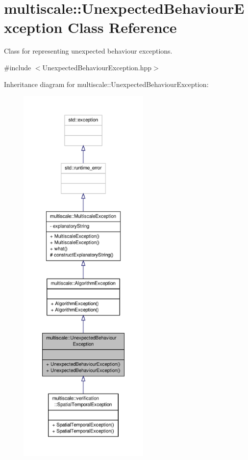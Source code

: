 \hypertarget{classmultiscale_1_1UnexpectedBehaviourException}{\section{multiscale\-:\-:Unexpected\-Behaviour\-Exception Class Reference}
\label{classmultiscale_1_1UnexpectedBehaviourException}
}


Class for representing unexpected behaviour exceptions.  




{\ttfamily \#include $<$Unexpected\-Behaviour\-Exception.\-hpp$>$}



Inheritance diagram for multiscale\-:\-:Unexpected\-Behaviour\-Exception\-:\nopagebreak
\begin{figure}[H]
\begin{center}
\leavevmode
\includegraphics[height=550pt]{classmultiscale_1_1UnexpectedBehaviourException__inherit__graph}
\end{center}
\end{figure}


